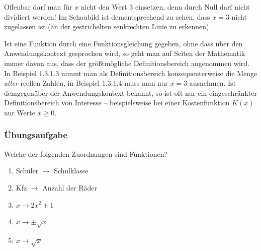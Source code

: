 \begin{center}
\end{center}

Offenbar darf man für $x$ nicht den Wert 3 einsetzen, denn durch Null darf nicht dividiert werden! Im Schaubild ist dementsprechend zu sehen, dass $x = 3$ nicht zugelassen ist (an der gestrichelten senkrechten Linie zu erkennen).\beispielende

Ist eine Funktion durch eine Funktionsgleichung gegeben, ohne dass über den Anwendungskontext gesprochen wird, so geht man auf Seiten der Mathematik immer davon aus, dass der größtmögliche Definitionsbereich angenommen wird. In Beispiel 1.3.1.3 nimmt man als Definitionsbereich konsequenterweise die Menge \emph{aller} reellen Zahlen, in Beispiel 1.3.1.4 muss man nur $x = 3$ ausnehmen. Ist demgegenüber der Anwendungskontext bekannt, so ist oft nur ein eingeschränkter Definitionsbereich von Interesse -- beispielsweise bei einer Kostenfunktion $K(x)$ nur Werte $x \geq 0$.

\subsubsection{Übungsaufgabe}

\begin{graukasten}
  Welche der folgenden Zuordnungen sind Funktionen?
  \begin{enumerate}[label=\alph*)]
    \item Schüler $\rightarrow$ Schulklasse
    \item Kfz $\rightarrow$ Anzahl der Räder
    \item $x \rightarrow 2x^2 + 1$
    \item $x \rightarrow \pm\sqrt{x}$
    \item $x \rightarrow \sqrt{x}$
  \end{enumerate}
\end{graukasten}
